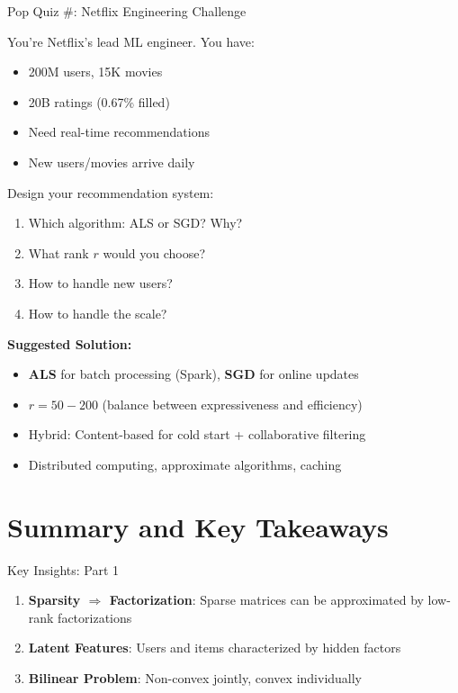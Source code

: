 \documentclass{beamer}
\begin{document}
\begin{frame}{Pop Quiz \#\thepopquiz: Netflix Engineering Challenge}
\begin{popquizbox}{\thepopquiz}
You're Netflix's lead ML engineer. You have:
\begin{itemize}
    \item 200M users, 15K movies  
    \item 20B ratings (0.67\% filled)
    \item Need real-time recommendations
    \item New users/movies arrive daily
\end{itemize}

\pause
Design your recommendation system:
\begin{enumerate}[<+->]
    \item Which algorithm: ALS or SGD? Why?
    \item What rank $r$ would you choose?
    \item How to handle new users?
    \item How to handle the scale?
\end{enumerate}

\pause
\textbf{Suggested Solution:}
\begin{itemize}
    \item \textbf{ALS} for batch processing (Spark), \textbf{SGD} for online updates
    \item $r = 50-200$ (balance between expressiveness and efficiency)
    \item Hybrid: Content-based for cold start + collaborative filtering
    \item Distributed computing, approximate algorithms, caching
\end{itemize}
\end{popquizbox}
\end{frame}

\section{Summary and Key Takeaways}

\begin{frame}{Key Insights: Part 1}
\begin{enumerate}[<+->]
    \item \textbf{Sparsity $\Rightarrow$ Factorization}: Sparse matrices can be approximated by low-rank factorizations
    
    \item \textbf{Latent Features}: Users and items characterized by hidden factors
    
    \item \textbf{Bilinear Problem}: Non-convex jointly, convex individually
\end{enumerate}
\end{frame}
\end{document}
